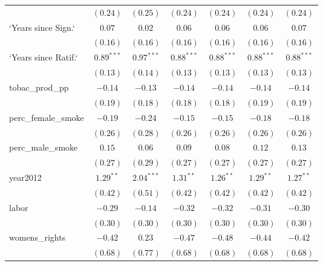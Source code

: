 \begin{table}[!h]
\begin{center}
\begin{tabular}{l c c c c c c }
                        & $(0.24)$     & $(0.25)$     & $(0.24)$     & $(0.24)$     & $(0.24)$     & $(0.24)$     \\
`Years since Sign.`     & $0.07$       & $0.02$       & $0.06$       & $0.06$       & $0.06$       & $0.07$       \\
                        & $(0.16)$     & $(0.16)$     & $(0.16)$     & $(0.16)$     & $(0.16)$     & $(0.16)$     \\
`Years since Ratif.`    & $0.89^{***}$ & $0.97^{***}$ & $0.88^{***}$ & $0.88^{***}$ & $0.88^{***}$ & $0.88^{***}$ \\
                        & $(0.13)$     & $(0.14)$     & $(0.13)$     & $(0.13)$     & $(0.13)$     & $(0.13)$     \\
tobac\_prod\_pp         & $-0.14$      & $-0.13$      & $-0.14$      & $-0.14$      & $-0.14$      & $-0.14$      \\
                        & $(0.19)$     & $(0.18)$     & $(0.18)$     & $(0.18)$     & $(0.19)$     & $(0.19)$     \\
perc\_female\_smoke     & $-0.19$      & $-0.24$      & $-0.15$      & $-0.15$      & $-0.18$      & $-0.18$      \\
                        & $(0.26)$     & $(0.28)$     & $(0.26)$     & $(0.26)$     & $(0.26)$     & $(0.26)$     \\
perc\_male\_smoke       & $0.15$       & $0.06$       & $0.09$       & $0.08$       & $0.12$       & $0.13$       \\
                        & $(0.27)$     & $(0.29)$     & $(0.27)$     & $(0.27)$     & $(0.27)$     & $(0.27)$     \\
year2012                & $1.29^{**}$  & $2.04^{***}$ & $1.31^{**}$  & $1.26^{**}$  & $1.29^{**}$  & $1.27^{**}$  \\
                        & $(0.42)$     & $(0.51)$     & $(0.42)$     & $(0.42)$     & $(0.42)$     & $(0.42)$     \\
labor                   & $-0.29$      & $-0.14$      & $-0.32$      & $-0.32$      & $-0.31$      & $-0.30$      \\
                        & $(0.30)$     & $(0.30)$     & $(0.30)$     & $(0.30)$     & $(0.30)$     & $(0.30)$     \\
womens\_rights          & $-0.42$      & $0.23$       & $-0.47$      & $-0.48$      & $-0.44$      & $-0.42$      \\
                        & $(0.68)$     & $(0.77)$     & $(0.68)$     & $(0.68)$     & $(0.68)$     & $(0.68)$     \\

\end{tabular}
\end{center}
\end{table}
